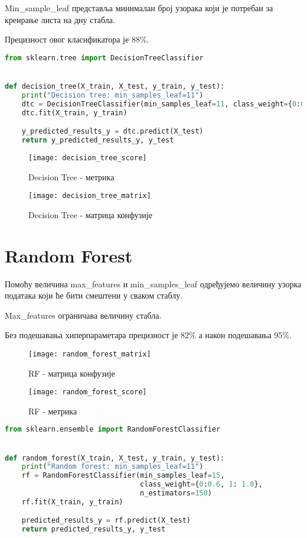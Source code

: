 \documentclass[11pt]{article} %
\begin{document}
Min\_sample\_leaf представља минималан број узорака који је потребан за креирање листа на дну стабла.

Прецизност овог класификатора је 88\%.

\begin{lstlisting}[language=Python,title=Пример 5. ]
from sklearn.tree import DecisionTreeClassifier


def decision_tree(X_train, X_test, y_train, y_test):
    print("Decision tree: min_samples_leaf=11")
    dtc = DecisionTreeClassifier(min_samples_leaf=11, class_weight={0:0.8, 1: 1.0})
    dtc.fit(X_train, y_train)

    y_predicted_results_y = dtc.predict(X_test)
    return y_predicted_results_y, y_test
\end{lstlisting}

\begin{figure}[h]
\centering
	\texttt{[image: decision\_tree\_score]} 
	\caption{Decision Tree - метрика} 
\end{figure}

\newpage


\begin{figure}[h]
\centering
	\texttt{[image: decision\_tree\_matrix]} 
	\caption{Decision Tree - матрица конфузије} 
\end{figure}


\section{Random Forest}
Помоћу величина max\_features и min\_samples\_leaf одређујемо величину узорка података који ће бити смештени у сваком стаблу.

Max\_features ограничава величину стабла.

Без подешавања хиперпараметара прецизност је 82\% а након подешавања 95\%.

\begin{figure}[h]
\centering
	\texttt{[image: random\_forest\_matrix]} 
	\caption{RF - матрица конфузије} 
\end{figure}

\begin{figure}[h]
\centering
	\texttt{[image: random\_forest\_score]} 
	\caption{RF - метрика} 
\end{figure}

\begin{lstlisting}[language=Python,title=Пример 6. Random forest код]
from sklearn.ensemble import RandomForestClassifier


def random_forest(X_train, X_test, y_train, y_test):
    print("Random forest: min_samples_leaf=11")
    rf = RandomForestClassifier(min_samples_leaf=15,
                                class_weight={0:0.6, 1: 1.0},
                                n_estimators=150)
    rf.fit(X_train, y_train)

    predicted_results_y = rf.predict(X_test)
    return predicted_results_y, y_test


\end{lstlisting}
\end{document}
